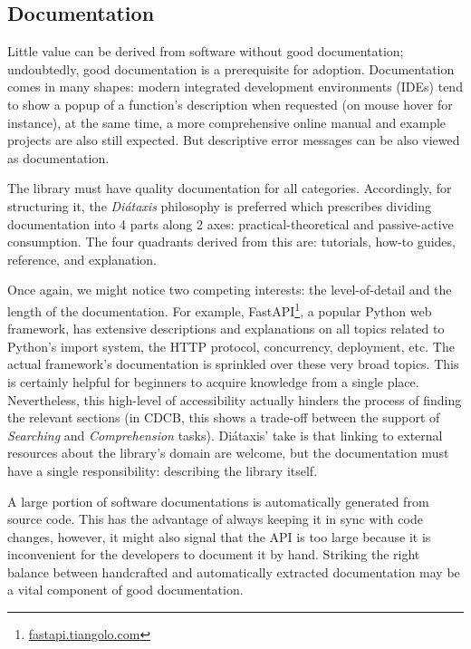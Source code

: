 \subsection{Documentation}

Little value can be derived from software without good documentation; undoubtedly, good documentation is a prerequisite for adoption. Documentation comes in many shapes: modern integrated development environments (IDEs) tend to show a popup of a function's description when requested (on mouse hover for instance), at the same time, a more comprehensive online manual and example projects are also still expected. But descriptive error messages can be also viewed as documentation. 

The library must have quality documentation for all categories. Accordingly, for structuring it, the \textit{Diátaxis} philosophy is preferred \cite{Procida_Diataxis_documentation_framework} which prescribes dividing documentation into 4 parts along 2 axes: practical-theoretical and passive-active consumption. The four quadrants derived from this are: tutorials, how-to guides, reference, and explanation.

Once again, we might notice two competing interests: the level-of-detail and the length of the documentation. For example, FastAPI\footnote{\href{https://fastapi.tiangolo.com/async/\#concurrent-burgers}{fastapi.tiangolo.com}}, a popular Python web framework, has extensive descriptions and explanations on all topics related to Python's import system, the HTTP protocol, concurrency, deployment, etc. The actual framework's documentation is sprinkled over these very broad topics. This is certainly helpful for beginners to acquire knowledge from a single place. Nevertheless, this high-level of accessibility actually hinders the process of finding the relevant sections (in CDCB, this shows a trade-off between the support of \textit{Searching} and \textit{Comprehension} tasks). Diátaxis' take is that linking to external resources about the library's domain are welcome, but the documentation must have a single responsibility: describing the library itself.

A large portion of software documentations is automatically generated from source code. This has the advantage of always keeping it in sync with code changes, however, it might also signal that the API is too large because it is inconvenient for the developers to document it by hand. Striking the right balance between handcrafted and automatically extracted documentation may be a vital component of good documentation.

